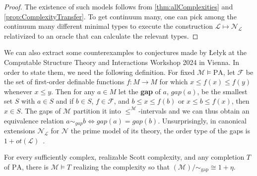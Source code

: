 \documentclass[11pt]{amsart}
\newcommand{\M}{\mathcal{M}}
\newcommand{\N}{\mathcal{N}}
\newcommand{\mc}[1]{\mathcal{#1}}
\newcommand{\LR}{\Leftrightarrow}
\newcommand{\PA}{\mathrm{PA}}
\def\M{{\mathcal M}}
\def\N{{\mathcal N}}
\theoremstyle{remark}
\newcommand{\define}[1]{\textbf{#1}}
\begin{document}
\begin{proof}
    The existence of such models follows from \cref{thm:allComplexities} and \cref{prop:ComplexityTransfer}.
    To get continuum many, one can pick among the continuum many different minimal types to execute the construction $\mc{L}\mapsto\mc{N}_\mc{L}$ relativized to an oracle that can calculate the relevant types.
\end{proof}

We can also extract some counterexamples to conjectures made by \L{}e\l{}yk at the Computable Structure Theory and Interactions Workshop 2024 in Vienna.
In order to state them, we need the following definition.
For fixed $\M\models \PA$, let $\mathcal F$ be the set of first-order definable functions $f:
M\to M$ for which $x\leq f(x)\leq f(y)$ whenever $x\leq y$. Then for any $a\in M$
let the \define{gap} of $a$, $gap(a)$, be the smallest set $S$ with $a\in S$ and if $b\in S$,
$f\in\mc F$, and $b\leq x\leq f(b)$ or $x\leq b\leq f(x)$, then $x\in S$.
The gaps of $\M$
partition it into $\leq^\M$-intervals and we can thus obtain
an equivalence relation $a\sim_{gap} b \LR gap(a)=gap(b)$.
Unsurprisingly, in canonical extensions $\N_\mc{L}$ for $\N$ the prime model of its theory, the order type of the gaps is $1+ot(\mc{L})$~\cite[Corollary 3.3.6]{KS}.
\begin{proposition}
	For every sufficiently complex, realizable Scott complexity, and any completion $T$ of $\PA$, there is $\mc{M}\models T$ realizing the complexity so that $(\mc{M}){/}{\sim_{\text{gap}}}\cong 1+\eta$.
\end{proposition}
\end{document}
